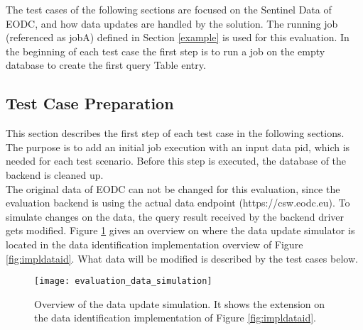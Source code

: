 \documentclass[draft,final]{vutinfth} %
\begin{document}
The test cases of the following sections are focused on the Sentinel Data of EODC, and how data updates are handled by the solution. The running job (referenced as jobA) defined in Section \ref{example} is used for this evaluation. In the beginning of each test case the first step is to run a job on the empty database to create the first query Table entry. 

\subsection{Test Case Preparation}
This section describes the first step of each test case in the following sections. The purpose is to add an initial job execution with an input data pid, which is needed for each test scenario. Before this step is executed, the database of the backend is cleaned up.\\ The original data of EODC can not be changed for this evaluation, since the evaluation backend is using the actual data endpoint (https://csw.eodc.eu). To simulate changes on the data, the query result received by the backend driver gets modified. Figure \ref{fig:eva_data_simulation} gives an overview on where the data update simulator is located in the data identification implementation overview of Figure \ref{fig:impldataid}. What data will be modified is described by the test cases below. \\

\begin{figure}[h]
	\centering
	\texttt{[image: evaluation\_data\_simulation]}
	\caption{Overview of the data update simulation. It shows the extension on the data identification implementation of Figure \ref{fig:impldataid}.}
	\label{fig:eva_data_simulation} %
\end{figure}
\end{document}

